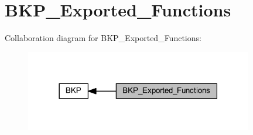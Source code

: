 \hypertarget{group___b_k_p___exported___functions}{}\section{B\+K\+P\+\_\+\+Exported\+\_\+\+Functions}
\label{group___b_k_p___exported___functions}
Collaboration diagram for B\+K\+P\+\_\+\+Exported\+\_\+\+Functions\+:
\nopagebreak
\begin{figure}[H]
\begin{center}
\leavevmode
\includegraphics[width=282pt]{group___b_k_p___exported___functions}
\end{center}
\end{figure}
